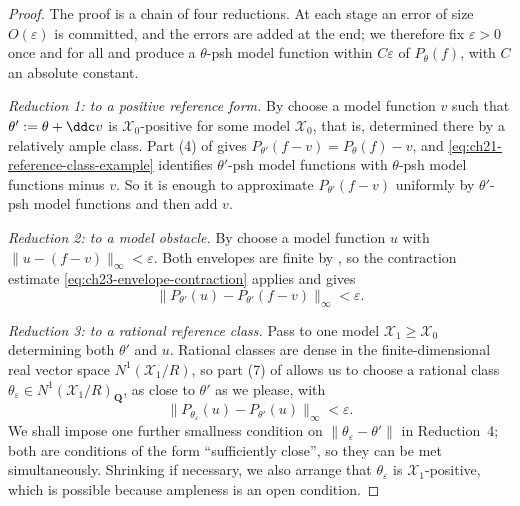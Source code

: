 \begin{proof}
The proof is a chain of four reductions.  At each stage an error of size
\(O(\varepsilon)\) is committed, and the errors are added at the end; we
therefore fix \(\varepsilon>0\) once and for all and produce a
\(\theta\)-psh model function within \(C\varepsilon\) of \(P_\theta(f)\),
with \(C\) an absolute constant.

\emph{Reduction 1: to a positive reference form.}
By  choose a model function \(v\)
such that \(\theta':=\theta+\ddc v\) is \(\mathcal X_0\)-positive for some
model \(\mathcal X_0\), that is, determined there by a relatively ample
class.  Part (4) of  gives
\(P_{\theta'}(f-v)=P_\theta(f)-v\), and
\eqref{eq:ch21-reference-class-example} identifies \(\theta'\)-psh model
functions with \(\theta\)-psh model functions minus \(v\).  So it is enough
to approximate \(P_{\theta'}(f-v)\) uniformly by \(\theta'\)-psh model
functions and then add \(v\).

\emph{Reduction 2: to a model obstacle.}
By  choose a model function \(u\) with
\(\|u-(f-v)\|_\infty<\varepsilon\).  Both envelopes are finite by
, so the contraction estimate
\eqref{eq:ch23-envelope-contraction} applies and gives
\begin{equation}\label{eq:ch23-obstacle-reduction}
       \|P_{\theta'}(u)-P_{\theta'}(f-v)\|_\infty<\varepsilon.
\end{equation}

\emph{Reduction 3: to a rational reference class.}
Pass to one model \(\mathcal X_1\geq\mathcal X_0\) determining both
\(\theta'\) and \(u\).  Rational classes are dense in the
finite-dimensional real vector space \(N^1(\mathcal X_1/R)\), so part (7) of
 allows us to choose a rational
class \(\theta_\varepsilon\in N^1(\mathcal X_1/R)_{\mathbf Q}\), as close to
\(\theta'\) as we please, with
\begin{equation}\label{eq:ch23-class-reduction}
 \|P_{\theta_\varepsilon}(u)-P_{\theta'}(u)\|_\infty<\varepsilon .
\end{equation}
We shall impose one further smallness condition on
\(\|\theta_\varepsilon-\theta'\|\) in Reduction~4; both are conditions of the
form ``sufficiently close'', so they can be met simultaneously.  Shrinking
if necessary, we also arrange that \(\theta_\varepsilon\) is
\(\mathcal X_1\)-positive, which is possible because ampleness is an open
condition.


\end{proof}
